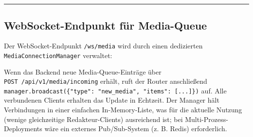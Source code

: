 \begin{center}\rule{0.5\linewidth}{0.5pt}\end{center}

\subsection{WebSocket-Endpunkt für
Media-Queue}\label{websocket-endpunkt-fuxfcr-media-queue}

Der WebSocket-Endpunkt \texttt{/ws/media} wird durch einen dedizierten
\texttt{MediaConnectionManager} verwaltet:

\begin{Shaded}
\begin{Highlighting}[]
     \NormalTok{(}\NormalTok{) }\OperatorTok{{-}\textgreater{}} \NormalTok{:}
        \NormalTok{[WebSocket] }\OperatorTok{=}\NormalTok{ []}

      \NormalTok{(}\OperatorTok{{-}\textgreater{}} \NormalTok{:}

     \NormalTok{) }\OperatorTok{{-}\textgreater{}} \NormalTok{:}
\NormalTok{[WebSocket] }\OperatorTok{=}\NormalTok{ []}
         
            \NormalTok{:}
            \NormalTok{):}
\end{Highlighting}
\end{Shaded}

Wenn das Backend neue Media-Queue-Einträge über
\texttt{POST\ /api/v1/media/incoming} erhält, ruft der Router
anschließend
\texttt{manager.broadcast(\{"type":\ "new\_media",\ "items":\ {[}...{]}\})}
auf. Alle verbundenen Clients erhalten das Update in Echtzeit. Der
Manager hält Verbindungen in einer einfachen In-Memory-Liste, was für
die aktuelle Nutzung (wenige gleichzeitige Redakteur-Clients)
ausreichend ist; bei Multi-Prozess-Deployments wäre ein externes
Pub/Sub-System (z. B. Redis) erforderlich.

